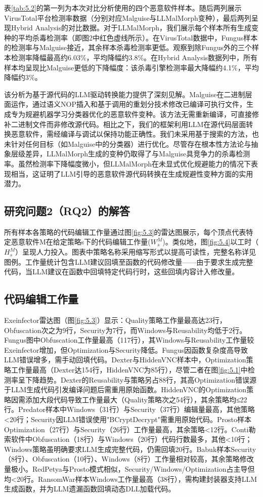 表\ref{tab:5.2}的第一列为本次对比分析使用的四个恶意软件样本。随后两列展示VirusTotal平台检测率数据（分别对应Malguise与LLMalMorph变种），最后两列呈现Hybrid Analysis的对比数据。对于LLMalMorph，我们展示每个样本所有生成变种的平均杀毒检测率（即图2中红色虚线所示）。在VirusTotal数据中，Fungus样本的检测率与Malguise接近，其余样本杀毒检测率更低。观察到除Fungus外的三个样本检测率降幅最高约6.03\%，平均降幅约3.8\%。在Hybrid Analysis数据列中，所有样本均呈现比Malguise更低的下降幅度：该杀毒引擎检测率最大降幅约4.1\%，平均降幅约3\%。

该分析为基于源代码的LLM驱动转换能力提供了深刻见解。Malguise在二进制层面运作，通过语义NOP插入和基于调用的重划分技术修改已编译可执行文件，生成专为规避机器学习分类器优化的恶意软件变种。该方法无需重新编译，可直接修补二进制文件而非修改源代码。相比之下，我们的框架利用LLM在源代码层面转换恶意软件，需经编译与调试以保持功能正确性。我们未采用基于搜索的方法，也未针对任何目标（如Malguise中的分类器）进行优化。尽管存在根本性方法论与抽象层级差异，LLMalMorph生成的变种仍取得了与Malguise具竞争力的杀毒检测率。虽然检测率下降幅度微小，但LLMalMorph在未显式优化规避能力的情况下表现相当，这证明了LLM引导的恶意软件源代码转换在生成规避性变种方面的实用潜力。

\subsection{研究问题2（RQ2）的解答}
所有样本各策略的代码编辑工作量通过图\ref{fig:5.3}的雷达图展示，每个顶点代表特定恶意软件M在给定策略s下的代码编辑工作量($W_{s}^{M}$)。类似地，图\ref{fig:5.4}以工时（$H_{s}^{M}$）呈现人力投入。图表中策略名称采用缩写形式以提高可读性，完整名称详见图例。工作量统计包含LLM建议回填至函数的代码修改量——由于要求生成完整代码，当LLM建议在函数中回填特定代码行时，这些回填内容计入修改量。

\subsection{代码编辑工作量}
Exeinfector雷达图（图\ref{fig:5.3}）显示：Quality策略工作量最高达23行，Obfuscation次之为9行，Security为7行，而Windows与Reusability均低于2行。Fungus图中Obfuscation工作量最高（117行），其Windows与Reusability工作量较Exeinfector增加，但Optimization与Security降低。Fungus因函数复杂度高导致LLM错误增多，需手动回填代码。Dexter与HiddenVNC样本中，Optimization策略工作量最高（Dexter达154行，HiddenVNC为85行），尽管二者在图\ref{fig:5.1}中检测率呈下降趋势。Dexter的Reusability与策略另占88行，其高Optimization错误源于LLM生成代码引发编译问题后需重用原始函数。HiddenVNC的Optimization策略因需添加大段代码导致工作量最大（Quality策略次之54行），其余策略均≤22行。Predator样本中Windows（31行）与Security（37行）编辑量最高，其他策略<20行；Security因LLM错误使用"BCryptDecrypt"需重用原始代码。Prosto样本Optimization（27行）与Security（26行）工作量最高，其余策略<12行。Conti勒索软件中Obfuscation（18行）与Windows（20行）代码行数最多，其他<10行；Windows策略虽明确要求LLM生成完整代码，仍需回填20行。Babuk样本Security（8行）、Obfuscation（10行）、Windows（8行）工作量相对较高，其余策略修改量极小。RedPetya与Prosto模式相似，Security/Windows/Optimization占主导但均<20行。RansomWar样本Windows工作量最高（38行），需构建封装器支持LLM生成函数，并为LLM遗漏函数回填动态DLL加载代码。

